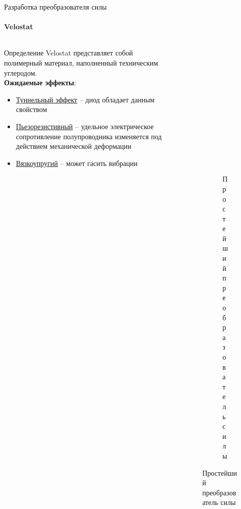 \documentclass[aspectratio=169,xcolor=table]{beamer}
\begin{document}
\begin{frame}[t]{Разработка преобразователя силы}
    \framesubtitle{Velostat}
    \vspace{-20pt}
    \begin{columns}[T,onlytextwidth]
        \begin{column}{0.6\textwidth}
            \begin{exampleblock}{Определение}
                Velostat представляет собой полимерный материал, наполненный техническим углеродом.\\
                \textbf{Ожидаемые эффекты}:
                \begin{itemize}
                    \item \underline{Туннельный эффект} -- диод обладает данным свойством
                    \item \underline{Пьезорезистивный} -- удельное электрическое сопротивление полупроводника изменяется под действием механической деформации
                    \item \underline{Вязкоупругий} -- может гасить вибрации
                \end{itemize}
            \end{exampleblock}
        \end{column}
        \begin{column}{0.38\textwidth}
            \vspace{-1cm}
            \begin{figure}[H]
                \begin{subfigure}{0.9\textwidth}
                    \centering\includegraphics[height=3cm,width=1\textwidth,keepaspectratio]{velostat_sensor.jpg}
                    \label{fig:velostat_sensor.jpg}
                \end{subfigure}

                \begin{subfigure}{0.9\textwidth}
                    \centering\includegraphics[height=3cm,width=1\textwidth,keepaspectratio]{simplest_sensor.jpg}
                    \caption*{Простейший преобразователь силы}
                    \label{fig:simplest_sensor.jpg}
                \end{subfigure}
            \end{figure}
        \end{column}
    \end{columns}

\end{frame}
\end{document}
